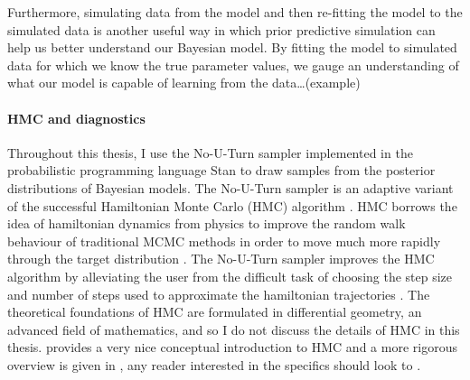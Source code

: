 Furthermore, simulating data from the model and then re-fitting the model to the simulated data is another useful way in which prior predictive simulation can help us better understand our Bayesian model. By fitting the model to simulated data for which we know the true parameter values, we gauge an understanding of what our model is capable of learning from the data\ldots (example)

\paragraph*{HMC and diagnostics}

Throughout this thesis, I use the No-U-Turn sampler \citep{hoffman_2014} implemented in the probabilistic programming language Stan \citep{Stan2022} to draw samples from the posterior distributions of Bayesian models. The No-U-Turn sampler is an adaptive variant of the successful Hamiltonian Monte Carlo (HMC) algorithm \citep{neil_2011}. HMC borrows the idea of hamiltonian dynamics from physics to improve the random walk behaviour of traditional MCMC methods in order to move much more rapidly through the target distribution \citep{BDA2020}. The No-U-Turn sampler improves the HMC algorithm by alleviating the user from the difficult task of choosing the step size and number of steps used to approximate the hamiltonian trajectories \citep{hoffman_2014}. The theoretical foundations of HMC are formulated in differential geometry, an advanced field of mathematics, and so I do not discuss the details of HMC in this thesis. \citet{betancourt_2017} provides a very nice conceptual introduction to HMC and a more rigorous overview is given in \citet[p.~300]{BDA2020}, any reader interested in the specifics should look to \citet{betancourt_2014}.

